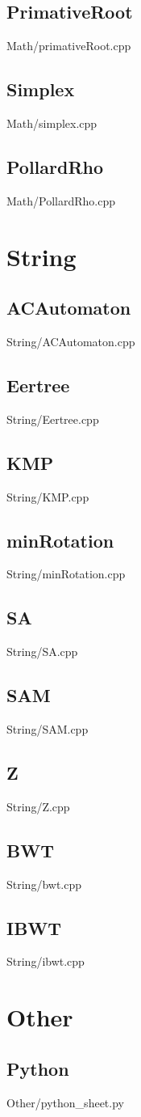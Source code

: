     \subsection{PrimativeRoot}
         {Math/primativeRoot.cpp}
    \subsection{Simplex}
         {Math/simplex.cpp}
    \subsection{PollardRho}
         {Math/PollardRho.cpp}

\section{String}
    \subsection{ACAutomaton}
         {String/ACAutomaton.cpp}
    \subsection{Eertree}
         {String/Eertree.cpp}
    \subsection{KMP}
         {String/KMP.cpp}
    \subsection{minRotation}
         {String/minRotation.cpp}
    \subsection{SA}
         {String/SA.cpp}
    \subsection{SAM}
         {String/SAM.cpp}
    \subsection{Z}
         {String/Z.cpp}
    \subsection{BWT}
         {String/bwt.cpp}
    \subsection{IBWT}
         {String/ibwt.cpp}

\section{Other}
    \subsection{Python}
         {Other/python_sheet.py}

